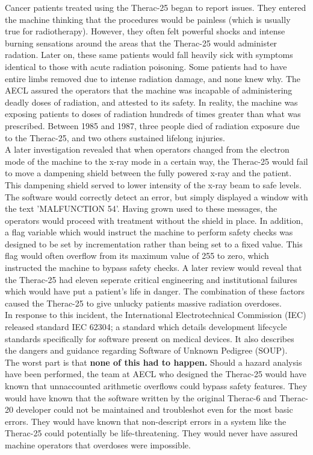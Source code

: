 \documentclass{article}
\begin{document}
Cancer patients treated using the Therac-25 began to report issues. They entered the machine thinking that the procedures would be painless (which is usually true for radiotherapy). However, they often felt powerful shocks and intense burning sensations around the areas that the Therac-25 would administer radation. Later on, these same patients would fall heavily sick with symptoms identical to those with acute radiation poisoning. Some patients had to have entire limbs removed due to intense radiation damage, and none knew why. The AECL assured the operators that the machine was incapable of administering deadly doses of radiation, and attested to its safety. In reality, the machine was exposing patients to doses of radiation hundreds of times greater than what was prescribed. Between 1985 and 1987, three people died of radiation exposure due to the Therac-25, and two others sustained lifelong injuries.\\

A later investigation revealed that when operators changed from the electron mode of the machine to the x-ray mode in a certain way, the Therac-25 would fail to move a dampening shield between the fully powered x-ray and the patient. This dampening shield served to lower intensity of the x-ray beam to safe levels. The software would correctly detect an error, but simply displayed a window with the text 'MALFUNCTION 54'. Having grown used to these messages, the operators would proceed with treatment without the shield in place. In addition, a flag variable which would instruct the machine to perform safety checks was designed to be set by incrementation rather than being set to a fixed value. This flag would often overflow from its maximum value of 255 to zero, which instructed the machine to bypass safety checks. A later review would reveal that the Therac-25 had eleven seperate critical engineering and institutional failures which would have put a patient's life in danger. The combination of these factors caused the Therac-25 to give unlucky patients massive radiation overdoses.\\

In response to this incident, the International Electrotechnical Commission (IEC) released standard IEC 62304; a standard which details development lifecycle standards specifically for software present on medical devices. It also describes the dangers and guidance regarding Software of Unknown Pedigree (SOUP).\\

The worst part is that \textbf{none of this had to happen.} Should a hazard analysis have been performed, the team at AECL who designed the Therac-25 would have known that unnaccounted arithmetic overflows could bypass safety features. They would have known that the software written by the original Therac-6 and Therac-20 developer could not be maintained and troubleshot even for the most basic errors. They would have known that non-descript errors in a system like the Therac-25 could potentially be life-threatening. They would never have assured machine operators that overdoses were impossible. \\
\end{document}
